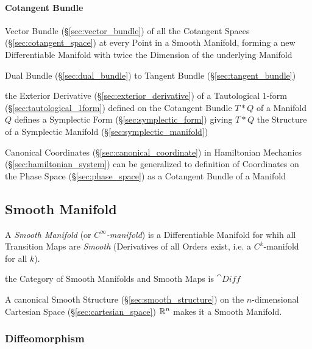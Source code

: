 \paragraph{Cotangent Bundle}\label{sec:cotangent_bundle}\hfill

Vector Bundle (\S\ref{sec:vector_bundle}) of all the Cotangent Spaces
(\S\ref{sec:cotangent_space}) at every Point in a Smooth Manifold, forming a
new Differentiable Manifold with twice the Dimension of the underlying Manifold

Dual Bundle (\S\ref{sec:dual_bundle}) to Tangent Bundle
(\S\ref{sec:tangent_bundle})

the Exterior Derivative (\S\ref{sec:exterior_derivative}) of a Tautological
$1$-form (\S\ref{sec:tautological_1form}) defined on the Cotangent Bundle $T *
Q$ of a Manifold $Q$ defines a Symplectic Form (\S\ref{sec:symplectic_form})
giving $T * Q$ the Structure of a Symplectic Manifold
(\S\ref{sec:symplectic_manifold})

Canonical Coordinates (\S\ref{sec:canonical_coordinate}) in Hamiltonian
Mechanics (\S\ref{sec:hamiltonian_system}) can be generalized to definition of
Coordinates on the Phase Space (\S\ref{sec:phase_space}) as a Cotangent Bundle
of a Manifold



\subsection{Smooth Manifold}\label{sec:smooth_manifold}

A \emph{Smooth Manifold} (or \emph{$C^\infty$-manifold}) is a Differentiable
Manifold for whih all Transition Maps are \emph{Smooth} (Derivatives of
all Orders exist, i.e. a $C^k$-manifold for all $k$).

the Category of Smooth Manifolds and Smooth Maps is $\cat{Diff}$

A canonical Smooth Structure (\S\ref{sec:smooth_structure}) on the
$n$-dimensional Cartesian Space (\S\ref{sec:cartesian_space}) $\mathbb{R}^n$ makes
it a Smooth Manifold.



\subsubsection{Diffeomorphism}\label{sec:diffeomorphism}

